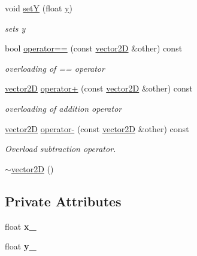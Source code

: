 \begin{DoxyCompactItemize}
void \mbox{\hyperlink{classvector2_d_a265f654087406a71b586430c2698f5ec}{setY}} (float \mbox{\hyperlink{classvector2_d_abe3fccbcc8141dc83e7597fd4564380f}{y}})
\begin{DoxyCompactList}\small\item\em sets y \end{DoxyCompactList}\item 
bool \mbox{\hyperlink{classvector2_d_a83cc70adce3b564d54cb2d0d5ffe2ef9}{operator==}} (const \mbox{\hyperlink{classvector2_d}{vector2D}} \&other) const
\begin{DoxyCompactList}\small\item\em overloading of == operator \end{DoxyCompactList}\item 
\mbox{\hyperlink{classvector2_d}{vector2D}} \mbox{\hyperlink{classvector2_d_a33d6cfdf94ab15b76f5ac0ad05c4109b}{operator+}} (const \mbox{\hyperlink{classvector2_d}{vector2D}} \&other) const
\begin{DoxyCompactList}\small\item\em overloading of addition operator \end{DoxyCompactList}\item 
\mbox{\hyperlink{classvector2_d}{vector2D}} \mbox{\hyperlink{classvector2_d_a4ce04081cc5ad5cad63696b6eed97bdc}{operator-\/}} (const \mbox{\hyperlink{classvector2_d}{vector2D}} \&other) const
\begin{DoxyCompactList}\small\item\em Overload subtraction operator. \end{DoxyCompactList}\item 
\mbox{\hyperlink{classvector2_d_af73bed617f7a6e1ffb9bd6aef4716b7c}{$\sim$vector2D}} ()
\end{DoxyCompactItemize}
\subsection*{Private Attributes}
\begin{DoxyCompactItemize}
\item 
\mbox{\label{classvector2_d_a35333a83751ac5c17d4a21f0a047b399}} 
float {\bfseries x\+\_\+}
\item 
\mbox{\label{classvector2_d_ad4d5d4f74364acf8c8a140ab56525ab1}} 
float {\bfseries y\+\_\+}
\end{DoxyCompactItemize}


